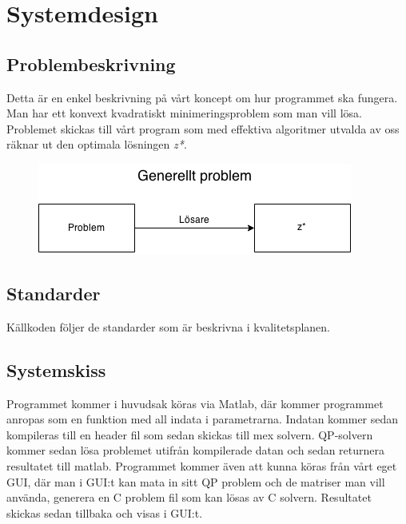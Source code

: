 \section{Systemdesign}


\subsection{Problembeskrivning}
Detta är en enkel beskrivning på vårt koncept om hur programmet ska fungera. Man har ett konvext kvadratiskt minimeringsproblem som man vill lösa. Problemet skickas till vårt program som med effektiva algoritmer utvalda av oss räknar ut den optimala lösningen \textit{z*}.

\begin{figure}[h]
	\begin{center}
		\includegraphics[scale=0.5]{bilder/Generellt.png}
	\end{center}
\end{figure}

\subsection{Standarder}
Källkoden följer de standarder som är beskrivna i kvalitetsplanen.

\subsection{Systemskiss}
Programmet kommer i huvudsak köras via Matlab, där kommer programmet anropas som en funktion med all indata i parametrarna. Indatan kommer sedan kompileras till en header fil som sedan skickas till mex solvern. QP-solvern kommer sedan lösa problemet utifrån kompilerade datan och sedan returnera resultatet till matlab. Programmet kommer även att kunna köras från vårt eget GUI, där man i GUI:t kan mata in sitt QP problem och de matriser man vill använda, generera en C problem fil som kan lösas av C solvern. Resultatet skickas sedan tillbaka och visas i GUI:t.

